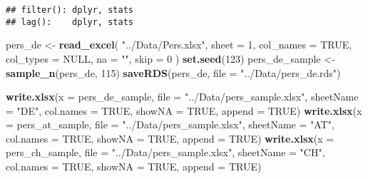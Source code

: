 \documentclass[]{article}
\newenvironment{Shaded}{\begin{snugshade}}{\end{snugshade}}
\newcommand{\KeywordTok}[1]{\textcolor[rgb]{0.13,0.29,0.53}{\textbf{{#1}}}}
\newcommand{\DataTypeTok}[1]{\textcolor[rgb]{0.13,0.29,0.53}{{#1}}}
\newcommand{\DecValTok}[1]{\textcolor[rgb]{0.00,0.00,0.81}{{#1}}}
\newcommand{\StringTok}[1]{\textcolor[rgb]{0.31,0.60,0.02}{{#1}}}
\newcommand{\OtherTok}[1]{\textcolor[rgb]{0.56,0.35,0.01}{{#1}}}
\newcommand{\NormalTok}[1]{{#1}}
\begin{document}
\begin{verbatim}
## filter(): dplyr, stats
## lag():    dplyr, stats
\end{verbatim}

\begin{Shaded}
\begin{Highlighting}[]
\NormalTok{pers_de <-}\StringTok{ }\KeywordTok{read_excel}\NormalTok{(}
        \StringTok{"../Data/Pers.xlsx"}\NormalTok{,}
        \DataTypeTok{sheet =} \DecValTok{1}\NormalTok{,}
        \DataTypeTok{col_names =} \OtherTok{TRUE}\NormalTok{,}
        \DataTypeTok{col_types =} \OtherTok{NULL}\NormalTok{,}
        \DataTypeTok{na =} \StringTok{""}\NormalTok{,}
        \DataTypeTok{skip =} \DecValTok{0}
        \NormalTok{)}
\KeywordTok{set.seed}\NormalTok{(}\DecValTok{123}\NormalTok{)}
\NormalTok{pers_de_sample <-}\StringTok{ }\KeywordTok{sample_n}\NormalTok{(pers_de, }\DecValTok{115}\NormalTok{)}
\KeywordTok{saveRDS}\NormalTok{(pers_de, }\DataTypeTok{file =} \StringTok{"../Data/pers_de.rds"}\NormalTok{)}
\end{Highlighting}
\end{Shaded}

\begin{Shaded}
\begin{Highlighting}[]
\KeywordTok{write.xlsx}\NormalTok{(}\DataTypeTok{x =} \NormalTok{pers_de_sample, }\DataTypeTok{file =} \StringTok{"../Data/pers_sample.xlsx"}\NormalTok{,}
           \DataTypeTok{sheetName =} \StringTok{"DE"}\NormalTok{, }\DataTypeTok{col.names =} \OtherTok{TRUE}\NormalTok{, }\DataTypeTok{showNA =} \OtherTok{TRUE}\NormalTok{, }\DataTypeTok{append =} \OtherTok{TRUE}\NormalTok{)}
\KeywordTok{write.xlsx}\NormalTok{(}\DataTypeTok{x =} \NormalTok{pers_at_sample, }\DataTypeTok{file =} \StringTok{"../Data/pers_sample.xlsx"}\NormalTok{,}
           \DataTypeTok{sheetName =} \StringTok{"AT"}\NormalTok{, }\DataTypeTok{col.names =} \OtherTok{TRUE}\NormalTok{, }\DataTypeTok{showNA =} \OtherTok{TRUE}\NormalTok{, }\DataTypeTok{append =} \OtherTok{TRUE}\NormalTok{)}
\KeywordTok{write.xlsx}\NormalTok{(}\DataTypeTok{x =} \NormalTok{pers_ch_sample, }\DataTypeTok{file =} \StringTok{"../Data/pers_sample.xlsx"}\NormalTok{,}
           \DataTypeTok{sheetName =} \StringTok{"CH"}\NormalTok{, }\DataTypeTok{col.names =} \OtherTok{TRUE}\NormalTok{, }\DataTypeTok{showNA =} \OtherTok{TRUE}\NormalTok{, }\DataTypeTok{append =} \OtherTok{TRUE}\NormalTok{)}
\end{Highlighting}
\end{Shaded}
\end{document}
